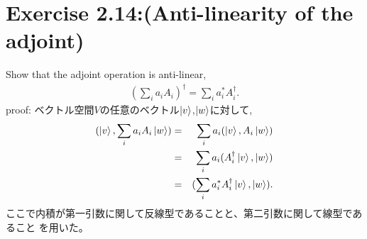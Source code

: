 \section{\Large Exercise 2.14:(Anti-linearity of the adjoint)}
Show that the adjoint operation is anti-linear,
\begin{eqnarray*}
(\sum_i a_i A_i)^\dagger = \sum_i a_i^* A_i^\dagger.
\end{eqnarray*}
{\large proof:}
ベクトル空間$V$の任意のベクトル$\ket{v}$,$\ket{w}$に対して,
\begin{eqnarray*}
(\ket{v}, \sum_i a_i A_i\ket{w})
&=& \sum_i a_i (\ket{v}, A_i\ket{w})\\
&=& \sum_i a_i (A_i^\dagger\ket{v}, \ket{w})\\
&=& (\sum_i a_i^* A_i^\dagger\ket{v}, \ket{w}).
\end{eqnarray*}
ここで内積が第一引数に関して反線型であることと、第二引数に関して線型であること
を用いた。
